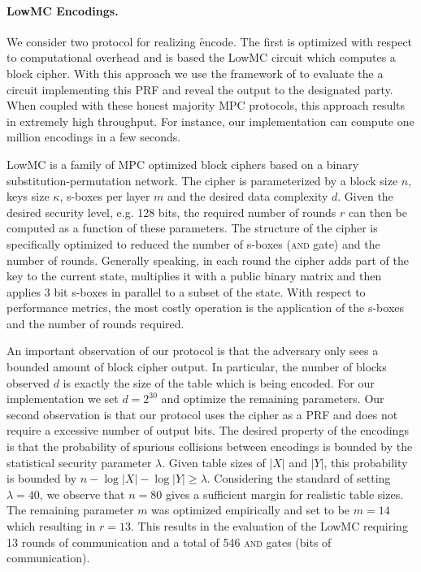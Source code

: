 \paragraph{LowMC Encodings.}
We consider two protocol for realizing \f{encode}. The first is optimized with respect to computational overhead and is based the LowMC circuit\cite{lowmc} which computes a block cipher. With this approach we use the framework of \cite{aby3, highthroughput} to evaluate the a circuit implementing this PRF and reveal the output to the designated party. When coupled with these honest majority MPC protocols, this approach results in extremely high throughput. For instance, our implementation can compute one million encodings in a few seconds.

LowMC is a family of MPC optimized block ciphers based on a binary substitution-permutation network. The cipher is parameterized by a block size $n$, keys size $\kappa$, s-boxes per layer $m$ and the desired data complexity $d$. Given the desired security level, e.g. 128 bits, the required number of rounds $r$ can then be computed as a function of these parameters. The structure of the cipher is specifically optimized to reduced the number of s-boxes (\textsc{and} gate) and the number of rounds. Generally speaking, in each round the cipher adds part of the key to the current state, multiplies it with a public binary matrix and then applies 3 bit s-boxes in parallel to a subset of the state. With respect to performance metrics, the most costly operation is the application of the s-boxes and the number of rounds required. 

An important observation of our protocol is that the adversary only sees a bounded amount of block cipher output. In particular, the number of blocks observed $d$ is exactly the size of the table which is being encoded. For our implementation we set $d=2^{30}$ and optimize the remaining parameters. Our second observation is that our protocol uses the cipher as a PRF and does not require a excessive number of output bits. The desired property of the encodings is that the probability of spurious collisions between encodings is bounded by the statistical security parameter $\lambda$. Given table sizes of $|X|$ and $|Y|$, this probability is bounded by $n-\log |X|-\log |Y|\geq \lambda$. Considering the standard of setting $\lambda=40$, we observe that $n=80$ gives a sufficient margin for realistic table sizes. The remaining parameter $m$ was optimized empirically and set to be $m=14$ which resulting in $r=13$. This results in the evaluation of the LowMC requiring 13 rounds of communication and a total of 546 \textsc{and} gates (bits of communication).



